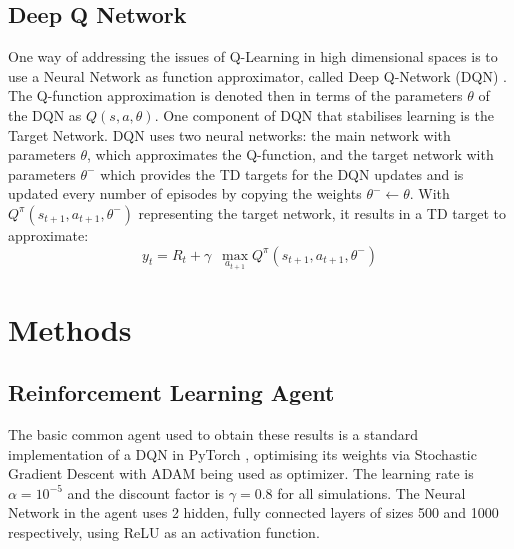 \documentclass[conference]{IEEEtran}
\begin{document}
\subsection{Deep Q Network}
One way of addressing the issues of Q-Learning in high dimensional spaces is to use a Neural Network as function approximator, called Deep Q-Network (DQN) \cite{mnih2015}.
The Q-function approximation is denoted then in terms of the parameters $\theta$ of the DQN as $Q(s,a,\theta)$.
One component of DQN that stabilises learning is the Target Network. DQN uses two neural networks: the main network with parameters $\theta$, which approximates the Q-function, and the target network with parameters $\theta^-$ which provides the TD targets for the DQN updates and is updated every number of episodes by copying the weights $\theta^- \leftarrow \theta$. With $Q^{\pi} (s_{t+1}, a_{t+1}, \theta^-)$ representing the target network, it results in a TD target to approximate:
\begin{equation}
y_t = R_t + \gamma \,\,\, \max_{a_{t+1}} Q^{\pi} (s_{t+1}, a_{t+1}, \theta^-)
\end{equation}
\section{Methods}
\label{methods}
\subsection{Reinforcement Learning Agent}
The basic common agent used to obtain these results is a standard implementation of a DQN in PyTorch \cite{pytorch}, optimising its weights via Stochastic Gradient Descent \cite{kiefer} with ADAM \cite{adam} being used as optimizer.
The learning rate is $\alpha=10^{-5}$ and the discount factor is $\gamma = 0.8$ for all simulations.
The Neural Network in the agent uses 2 hidden, fully connected layers of sizes 500 and 1000 respectively, using ReLU as an activation function.
\end{document}
